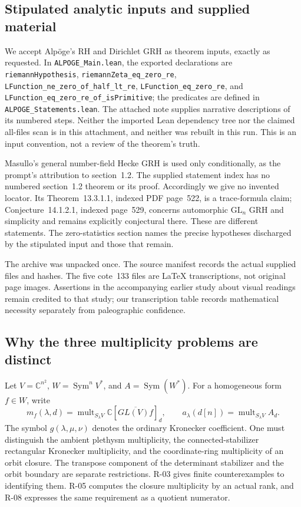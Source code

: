\subsection{Stipulated analytic inputs and supplied material}

We accept Alp\"oge's RH and Dirichlet GRH as theorem inputs, exactly as requested. In \texttt{ALPOGE\_Main.lean}, the exported declarations are \texttt{riemannHypothesis}, \texttt{riemannZeta\_eq\_zero\_re}, \texttt{LFunction\_ne\_zero\_of\_half\_lt\_re}, \texttt{LFunction\_eq\_zero\_re}, and \texttt{LFunction\_eq\_zero\_re\_of\_isPrimitive}; the predicates are defined in \texttt{ALPOGE\_Statements.lean}. The attached note supplies narrative descriptions of its numbered steps. Neither the imported Lean dependency tree nor the claimed all-files scan is in this attachment, and neither was rebuilt in this run. This is an input convention, not a review of the theorem's truth.

Masullo's general number-field Hecke GRH is used only conditionally, as the prompt's attribution to section~1.2. The supplied statement index has no numbered section~1.2 theorem or its proof. Accordingly we give no invented locator. Its Theorem~13.3.1.1, indexed PDF page~522, is a trace-formula claim; Conjecture~14.1.2.1, indexed page~529, concerns automorphic $\mathrm{GL}_n$ GRH and simplicity and remains explicitly conjectural there. These are different statements. The zero-statistics section names the precise hypotheses discharged by the stipulated input and those that remain.

The archive was unpacked once. The source manifest records the actual supplied files and hashes. The five cote~133 files are LaTeX transcriptions, not original page images. Assertions in the accompanying earlier study about visual readings remain credited to that study; our transcription table records mathematical necessity separately from paleographic confidence.

\subsection{Why the three multiplicity problems are distinct}

Let $V=\mathbb C^{n^2}$, $W=\operatorname{Sym}^nV^*$, and $A=\operatorname{Sym}(W^*)$. For a homogeneous form $f\in W$, write
\[
 m_f(\lambda,d)=\operatorname{mult}_{S_\lambda V}\mathbb C[\overline{GL(V)f}]_d,
 \qquad a_\lambda(d[n])=\operatorname{mult}_{S_\lambda V}A_d.
\]
The symbol $g(\lambda,\mu,\nu)$ denotes the ordinary Kronecker coefficient. One must distinguish the ambient plethysm multiplicity, the connected-stabilizer rectangular Kronecker multiplicity, and the coordinate-ring multiplicity of an orbit closure. The transpose component of the determinant stabilizer and the orbit boundary are separate restrictions. R-03 gives finite counterexamples to identifying them. R-05 computes the closure multiplicity by an actual rank, and R-08 expresses the same requirement as a quotient numerator.


